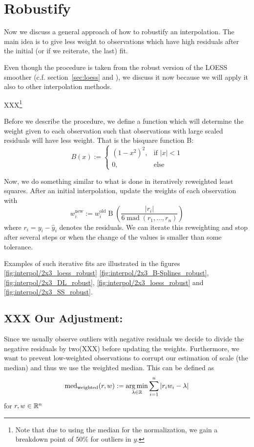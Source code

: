 \section{Robustify}
\label{sec:loess_robustify}
Now we discuss a general approach of how to robustify an interpolation. The main idea is to give less weight to observations which have high residuals after the initial (or if we reiterate, the last) fit.

Even though the procedure is taken from the robust version of the LOESS smoother (c.f. section~\ref{sec:loess} and \cite{clevelandRobustLocallyWeighted1979}), we discuss it now because we will apply it also to other interpolation methods.


XXX\footnote{Note that due to using the median for the normalization, we gain a breakdown point of $50 \%$ for outliers in $y$.}

Before we describe the procedure, we define a function which will determine the weight given to each observation such that observations with large scaled residuals will have less weight. That is the bisquare function B:
$$
	B(x):=\begin{cases}
		\left(1-x^{2}\right)^{2}, & \text{if } |x|<1 \\
		0,                        & \text{else }
	\end{cases}
$$

Now, we do something similar to what is done in iteratively reweighted least squares. After an initial interpolation, update the weights of each observation with
\begin{equation}
	w_i^\text{new}:=w_i^\text{old} \operatorname{B}\left(\frac{|r_i|}{6\operatorname{mad}\left(r_1,\dots,r_n\right)}\right)
	\label{eq:bisquare}
\end{equation}
where $r_i = y_i - \hat y_i$ denotes the residuals. We can iterate this reweighting and stop after several steps or when the change of the values is smaller than some tolerance.

Examples of such iterative fits are illustrated in the figures \ref{fig:interpol/2x3_loess_robust} \ref{fig:interpol/2x3_B-Splines_robust}, \ref{fig:interpol/2x3_DL_robust}, \ref{fig:interpol/2x3_loess_robust} and \ref{fig:interpol/2x3_SS_robust}.


\subsection{XXX Our Adjustment:} Since we usually observe outliers with negative residuals we decide to divide the negative residuals by two(XXX) before updating the weights. Furthermore, we want to prevent low-weighted observations to corrupt our estimation of scale (the median) and thus we use the weighted median. This can be defined as
$$
	\operatorname{med}_\text{weighted}(r,w) := \operatorname*{arg\, min}_{\lambda \in \mathbb{R}} \sum_{i=1}^n |r_iw_i -\lambda|
$$
for $r,w\in \mathbb{R}^n$
 

